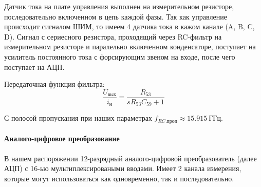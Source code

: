 Датчик тока на плате управления выполнен на измерительном резисторе, последовательно
включенном в цепь каждой фазы. Так как управление происходит сигналом ШИМ, то имеем 4
датчика тока в кажом канале (A, B, C, D).
Сигнал с сериесного резистора, проходящий через RC-фильтр на измерительном резисторе и паралельно включенном
конденсаторе, поступает на усилитель постоянного тока с форсирующим звеном на входе, после чего поступает на АЦП.

Передаточная функция фильтра:
$$
    \frac{ U_\text{вых} }{ i_\text{н} } = \frac{ R_{53} }{ s R_{53} C_{59} + 1 }
$$

С полосой пропускания при наших параметрах $f_{RC.\text{проп} } \approx 15.915 ~\text{ГГц}$.

\newpage
\paragraph{ Аналого-цифровое преобразование }
В нашем распоряжении 12-разрядный аналого-цифровой преобразователь (далее АЦП) с 16-ью
мультиплексироваными вводами.
Имеет 2 канала измерения, которые могут использоваться как одновременно, так и последовательно.

